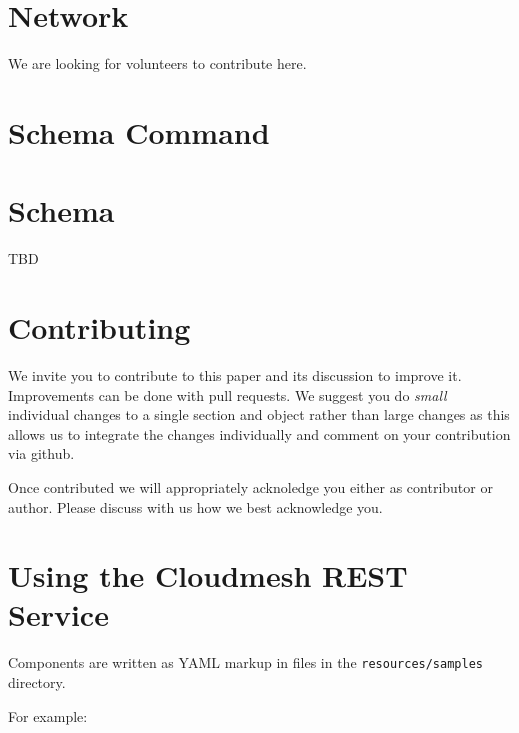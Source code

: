 \documentclass[9pt,twocolumn,twoside]{styles/osajnl}
\begin{document}

\section{Network}

We are looking for volunteers to contribute here.

\newpage

\appendix

\section{Schema Command}



\section{Schema}\label{a:schema}

TBD


\section{Contributing}

We invite you to contribute to this paper and its discussion to
improve it. Improvements can be done with pull requests. We suggest
you do {\em small} individual changes to a single section and object
rather than large changes as this allows us to integrate the changes
individually and comment on your contribution via github.

Once contributed we will appropriately acknoledge you either as
contributor or author. Please discuss with us how we best acknowledge
you.

\section{Using the Cloudmesh REST Service} 

Components are written as YAML markup in files in the
\verb+resources/samples+ directory.

For example:

\end{document}
